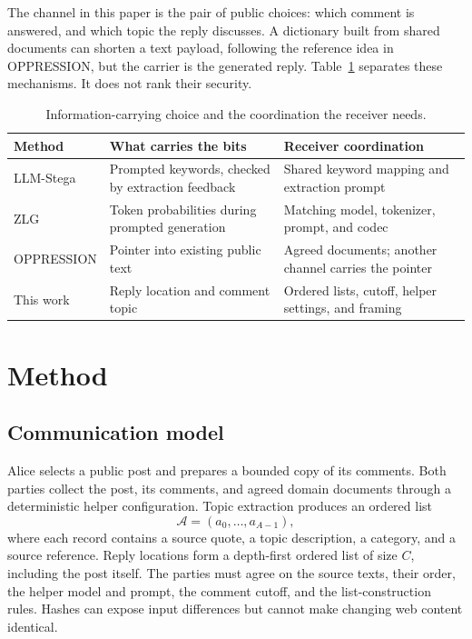 \documentclass[3p,times,procedia]{elsarticle}
\begin{document}
The channel in this paper is the pair of public choices: which comment is answered, and which topic the reply discusses. A dictionary built from shared documents can shorten a text payload, following the reference idea in OPPRESSION, but the carrier is the generated reply. Table~\ref{tab:mechanisms} separates these mechanisms. It does not rank their security.

\begin{table}[t]
\centering
\caption{Information-carrying choice and the coordination the receiver needs.}
\label{tab:mechanisms}
\begin{tabular}{lp{}p{}}
\toprule
Method & What carries the bits & Receiver coordination \\
\midrule
LLM-Stega & Prompted keywords, checked by extraction feedback & Shared keyword mapping and extraction prompt \\
ZLG & Token probabilities during prompted generation & Matching model, tokenizer, prompt, and codec \\
OPPRESSION & Pointer into existing public text & Agreed documents; another channel carries the pointer \\
This work & Reply location and comment topic & Ordered lists, cutoff, helper settings, and framing \\
\bottomrule
\end{tabular}
\end{table}

\section{Method}

\subsection{Communication model}

Alice selects a public post and prepares a bounded copy of its comments. Both parties collect the post, its comments, and agreed domain documents through a deterministic helper configuration. Topic extraction produces an ordered list
\[
\mathcal{A}=(a_0,\ldots,a_{A-1}),
\]
where each record contains a source quote, a topic description, a category, and a source reference. Reply locations form a depth-first ordered list of size $C$, including the post itself. The parties must agree on the source texts, their order, the helper model and prompt, the comment cutoff, and the list-construction rules. Hashes can expose input differences but cannot make changing web content identical.
\end{document}
